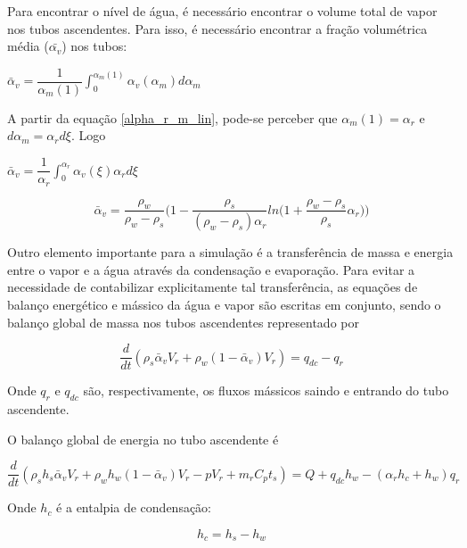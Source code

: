 Para encontrar o nível de água, é necessário encontrar o volume total
de vapor nos tubos ascendentes. Para isso, é necessário encontrar a
fração volumétrica média ($ \bar{\alpha_v} $) nos tubos:

\begin{center}
  $\bar{\alpha}_v = \dfrac{1}{\alpha_m(1)} \int_0^{\alpha_m(1)}
  \alpha_v(\alpha_m) d\alpha_m $
\end{center}

A partir da equação \ref{alpha_r_m_lin}, pode-se perceber que
$\alpha_m(1) = \alpha_r$ e $d\alpha_m = \alpha_r d\xi$. Logo

\begin{center}
  $\bar{\alpha}_v = \dfrac{1}{\alpha_r} \int_0^{\alpha_r}
  \alpha_v(\xi) \alpha_r d\xi$
\end{center}

\begin{equation}
  \bar{\alpha}_v = \dfrac{\rho_w}{\rho_w - \rho_s}
  \biggl( 1 - \dfrac{\rho_s}{(\rho_w - \rho_s)\alpha_r} ln\biggl( 1 +
  \dfrac{\rho_w - \rho_s}{\rho_s} \alpha_r \biggr) \biggr)
  \label{alfa_v_avg}
\end{equation}

Outro elemento importante para a simulação é a transferência de massa
e energia entre o vapor e a água através da condensação e
evaporação. Para evitar a necessidade de contabilizar explicitamente
tal transferência, as equações de balanço energético e mássico da água
e vapor são escritas em conjunto, sendo o balanço global de massa nos
tubos ascendentes representado por

\begin{equation}
  \dfrac{d}{dt} (\rho_s \bar{\alpha}_v V_r + \rho_w (1 -
  \bar{\alpha}_v)V_r) = q_{dc} - q_r
  \label{balanco_massa_riser}
\end{equation}

Onde $q_r$ e $q_{dc}$ são, respectivamente, os fluxos mássicos saindo
e entrando do tubo ascendente.

O balanço global de energia no tubo ascendente é

\begin{equation}
  \dfrac{d}{dt} (\rho_s h_s \bar{\alpha}_v V_r + \rho_w h_w (1 -
  \bar{\alpha}_v)V_r - pV_r + m_r C_p t_s) = Q + q_{dc} h_w -
  (\alpha_r h_c + h_w) q_r
  \label{balanco_energia_riser}
\end{equation}

Onde $h_c$ é a entalpia de condensação:

\begin{equation}
  h_c = h_s - h_w
  \label{h_c}
\end{equation}

